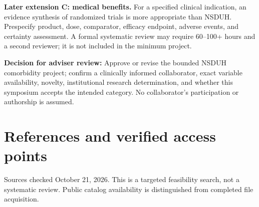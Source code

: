 \documentclass[10pt]{article}
\newcommand{\head}[1]{\section*{\color{navy}#1}}
\begin{document}
\textbf{Later extension C: medical benefits.} For a specified clinical indication, an evidence synthesis of randomized trials is more appropriate than NSDUH. Prespecify product, dose, comparator, efficacy endpoint, adverse events, and certainty assessment. A formal systematic review may require 60--100+ hours and a second reviewer; it is not included in the minimum project.

\textbf{Decision for adviser review:} Approve or revise the bounded NSDUH comorbidity project; confirm a clinically informed collaborator, exact variable availability, novelty, institutional research determination, and whether this symposium accepts the intended category. No collaborator's participation or authorship is assumed.
\newpage
\head{References and verified access points}
\small
Sources checked October 21, 2026. This is a targeted feasibility search, not a systematic review. Public catalog availability is distinguished from completed file acquisition.
\end{document}
